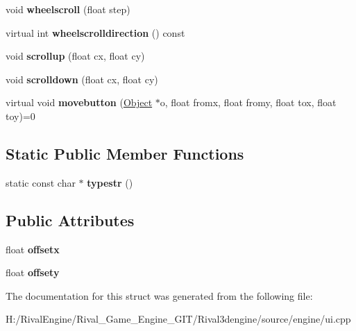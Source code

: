 \begin{DoxyCompactItemize}
void {\bfseries wheelscroll} (float step)
\item 
\mbox{\label{struct_u_i_1_1_scroll_bar_aa0886b8be46eaff5e7b3a523887708a2}} 
virtual int {\bfseries wheelscrolldirection} () const
\item 
\mbox{\label{struct_u_i_1_1_scroll_bar_a63897b6775eec7427ef89d1826f7d8fb}} 
void {\bfseries scrollup} (float cx, float cy)
\item 
\mbox{\label{struct_u_i_1_1_scroll_bar_a467d1175718ef6daaa402f59e2133e88}} 
void {\bfseries scrolldown} (float cx, float cy)
\item 
\mbox{\label{struct_u_i_1_1_scroll_bar_a1302bcea0bd56f002cab7baa229ec493}} 
virtual void {\bfseries movebutton} (\hyperlink{struct_u_i_1_1_object}{Object} $\ast$o, float fromx, float fromy, float tox, float toy)=0
\end{DoxyCompactItemize}
\subsection*{Static Public Member Functions}
\begin{DoxyCompactItemize}
\item 
\mbox{\label{struct_u_i_1_1_scroll_bar_a40813d891d2def26a1cd713413977787}} 
static const char $\ast$ {\bfseries typestr} ()
\end{DoxyCompactItemize}
\subsection*{Public Attributes}
\begin{DoxyCompactItemize}
\item 
\mbox{\label{struct_u_i_1_1_scroll_bar_a75096b3cab26eb75db199887e3d1f6a9}} 
float {\bfseries offsetx}
\item 
\mbox{\label{struct_u_i_1_1_scroll_bar_a7773a627bebaa7658949e8af8369eaa3}} 
float {\bfseries offsety}
\end{DoxyCompactItemize}


The documentation for this struct was generated from the following file\+:\begin{DoxyCompactItemize}
\item 
H\+:/\+Rival\+Engine/\+Rival\+\_\+\+Game\+\_\+\+Engine\+\_\+\+G\+I\+T/\+Rival3dengine/source/engine/ui.\+cpp\end{DoxyCompactItemize}
